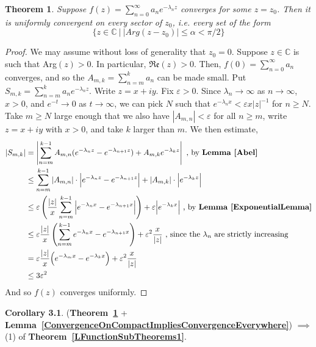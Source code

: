 \documentclass[12pt]{article}
\newcommand{\complex}{\mathbb{C}}
\newcommand{\lref}[1]{\textbf{Lemma~\ref{#1}}}
\newcommand{\tref}[1]{\textbf{Theorem~\ref{#1}}}
\newtheorem{thm}{Theorem}
\numberwithin{equation}{section}
\numberwithin{thm}{section}
\numberwithin{lemma}{section}
\numberwithin{cor}{section}
\begin{document}
\begin{thm}\label{DirichletSeriesConvergesOnSectors}
  Suppose $f(z) = \sum_{n=0}^{\infty} a_n e^{-\lambda_n z}$ converges for some $z = z_0$. Then it is uniformly convergent on every sector of $z_0$, i.e. every set of the form \begin{equation*}\{ z \in \complex \ | \ |Arg (z - z_0)| \leq \alpha < \pi/2\}\end{equation*}
\end{thm}
\begin{proof}
  We may assume without loss of generality that $z_0 = 0$. Suppose $z \in \complex$ is such that Arg$(z) > 0$. In particular, $\mathfrak{Re}(z) > 0$. Then, $f(0) = \sum_{n = 0}^{\infty} a_n$ converges, and so the $A_{m, k} = \sum_{n = m}^k a_n$ can be made small. Put $S_{m, k} = \sum_{n = m}^k a_n e^{-\lambda_n z}$. Write $z = x + iy$. Fix $\varepsilon > 0$. Since $\lambda_n \to \infty$ as $n \to \infty$, $x > 0$, and $e^{-t} \to 0$ as $t \to \infty$, we can pick $N$ such that $e^{-\lambda_n x} < \varepsilon x|z|^{-1}$ for $n \geq N$. Take $m \geq N$ large enough that we also have $|A_{m, n}| < \varepsilon$ for all $n \geq m$, write $z = x + iy$ with $x > 0$, and take $k$ larger than $m$. We then estimate, \begin{align*}
    |S_{m,k}| &= \left| \sum_{n=m}^{k-1} A_{m, n}(e^{-\lambda_n z} - e^{-\lambda_{n+1} z}) + A_{m,k}e^{-\lambda_k z} \right| \text{ , by } \lref{Abel} \\
    &\leq \sum_{n=m}^{k-1} |A_{m, n}| \cdot \Big|e^{-\lambda_n z} - e^{-\lambda_{n+1} z}\Big| + |A_{m,k}| \cdot \Big|e^{-\lambda_k z}\Big| \\
    &\leq \varepsilon \left( \frac{|z|}{x} \sum_{n=m}^{k-1} \Big|e^{-\lambda_n x} - e^{-\lambda_{n+1} x} \Big| \right) + \varepsilon \Big|e^{-\lambda_k x} \Big| \text{ , by } \lref{ExponentialLemma} \\
    &\leq \varepsilon \frac{|z|}{x} \left( \sum_{n=m}^{k-1} e^{-\lambda_n x} - e^{-\lambda_{n+1}x} \right) + \varepsilon^2 \frac{x}{|z|} \text{ , since the } \lambda_n \text{ are strictly increasing} \\
    &= \varepsilon \frac{|z|}{x} \Big(e^{-\lambda_m x} - e^{-\lambda_k x}\Big) + \varepsilon^2 \frac{x}{|z|} \\
    &\leq 3 \varepsilon^2
  \end{align*} And so $f(z)$ converges uniformly.
\end{proof}

\textbf{Corollary 3.1}. (\tref{DirichletSeriesConvergesOnSectors} + \lref{ConvergenceOnCompactImpliesConvergenceEverywhere}) $\implies$ (1) of \tref{LFunctionSubTheorems1}.
\end{document}
